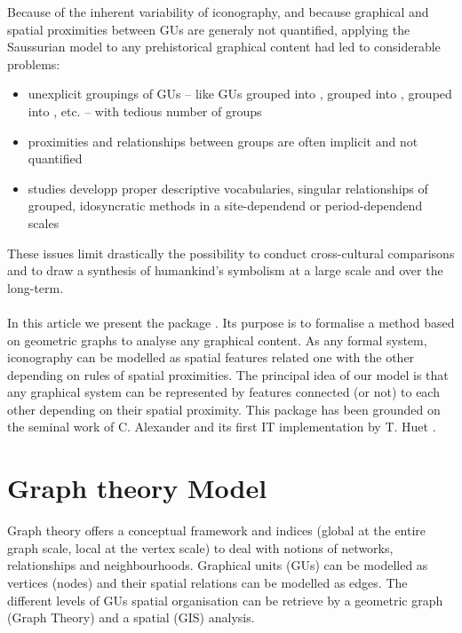 \documentclass[article]{jss}\usepackage{knitr}
\begin{document}
Because of the inherent variability of iconography, and because graphical and spatial proximities between GUs are generaly not quantified, applying the Saussurian model to any prehistorical graphical content had led to considerable problems:
\begin{itemize}
\setlength\itemsep{.05em}
  \item unexplicit groupings of GUs -- like GUs grouped into ,   grouped into ,  grouped into , etc. -- with tedious number of groups
  \item proximities and relationships between groups are often implicit and not quantified
  \item studies developp proper descriptive vocabularies, singular relationships of grouped, idosyncratic methods in a site-dependend or period-dependend scales 
\end{itemize}

These issues limit drastically the possibility to conduct cross-cultural comparisons and to draw a synthesis of humankind's symbolism at a large scale and over the long-term. 
\\
\\
In this article we present the  package . Its purpose is to formalise a method based on geometric graphs to analyse any graphical content. As any formal system, iconography can be modelled as spatial features related one with the other depending on rules of spatial proximities. The principal idea of our model is that any graphical system can be represented by features connected (or not) to each other depending on their spatial proximity. This package has been grounded on the seminal work of C. Alexander \citep{Alexander08} and its first IT implementation by T. Huet \citep{Huet18a}. 

\section[Model]{Graph theory Model} \label{sec:model}

Graph theory offers a conceptual framework and indices (global at the entire graph scale, local at the vertex scale) to deal with notions of networks, relationships and neighbourhoods. Graphical units (GUs) can be modelled as vertices (nodes) and their spatial relations can be modelled as edges. The different levels of GUs spatial organisation can be retrieve by a geometric graph (Graph Theory) and a spatial (GIS) analysis.
\end{document}
